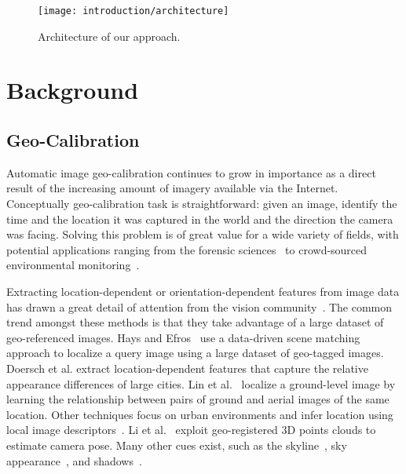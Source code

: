 \begin{figure}
  \centering
  \texttt{[image: introduction/architecture]}
  \caption{Architecture of our approach.}
  \label{fig:intro:architecture}
\end{figure}

\section{Background}

\subsection{Geo-Calibration}

Automatic image geo-calibration continues to grow in importance as a
direct result of the increasing amount of imagery available
via the Internet. Conceptually geo-calibration task is
straightforward: given an image, identify the time and the location it
was captured in the world and the direction the camera was facing.
Solving this problem is of great value for a wide variety of fields,
with potential applications ranging from the forensic
sciences~\cite{stylianou13jane} to crowd-sourced environmental
monitoring~\cite{zhang2012mining}.

Extracting location-dependent or orientation-dependent features from
image data has drawn a great detail of attention from the vision
community~\cite{jacobs07geolocate, jacobs11geolocate,
jacobs08geoorient}. The common trend amongst these methods is that
they take advantage of a large dataset of geo-referenced images. Hays
and Efros~\cite{hays2008im2gps} use a data-driven scene matching
approach to localize a query image using a large dataset of geo-tagged
images.  Doersch et al. extract location-dependent features that
capture the relative appearance differences of large cities.  Lin et
al.~\cite{lin2013cross} localize a ground-level image by learning the
relationship between pairs of ground and aerial images of the same
location. Other techniques focus on urban environments and infer
location using local image
descriptors~\cite{schindler2008detecting,snavely2006photo}. Li et
al.~\cite{li2012worldwide} exploit geo-registered 3D points clouds to
estimate camera pose. Many other cues exist, such as the
skyline~\cite{baatz2012large,ramalingam2009geolocalization}, sky
appearance~\cite{lalonde2010sun,workman2014rainbow}, and
shadows~\cite{junejo2008estimating,wu2010geo}.

